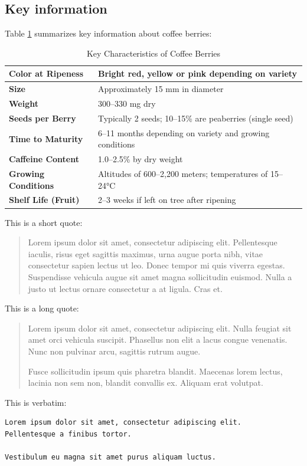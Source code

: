 \subsection{Key information}

Table \ref{ch2:tab:coffee_characteristics} summarizes key information about coffee berries:

\begin{table}
    \centering
    \caption{Key Characteristics of Coffee Berries}
    \medskip
    \label{ch2:tab:coffee_characteristics}
    \renewcommand{\arraystretch}{1.5}
    \begin{tabular}{|>{\bfseries}p{2in}|p{4in}|}
        \hline
        Color at Ripeness & Bright red, yellow or pink depending on variety \\
        \hline
        Size & Approximately 15 mm in diameter \\
        \hline
        Weight & 300--330 mg dry \\
        \hline
        Seeds per Berry & Typically 2 seeds; 10--15\% are peaberries (single seed) \\
        \hline
        Time to Maturity & 6--11 months depending on variety and growing conditions \\
        \hline
        Caffeine Content & 1.0--2.5\% by dry weight \\
        \hline
        Growing Conditions & Altitudes of 600--2,200 meters; temperatures of 15--24°C \\
        \hline
        Shelf Life (Fruit) & 2--3 weeks if left on tree after ripening \\
        \hline
    \end{tabular}
\end{table}

This is a short quote:
\begin{quote}
Lorem ipsum dolor sit amet, consectetur adipiscing elit. Pellentesque iaculis,
risus eget sagittis maximus, urna augue porta nibh, vitae consectetur sapien
lectus ut leo. Donec tempor mi quis viverra egestas. Suspendisse vehicula augue
sit amet magna sollicitudin euismod. Nulla a justo ut lectus ornare consectetur
a at ligula. Cras et.
\end{quote}

This is a long quote:
\begin{quotation}
Lorem ipsum dolor sit amet, consectetur adipiscing elit. Nulla feugiat sit
amet orci vehicula suscipit. Phasellus non elit a lacus congue venenatis.
Nunc non pulvinar arcu, sagittis rutrum augue.

Fusce sollicitudin ipsum quis pharetra blandit. Maecenas lorem lectus,
lacinia non sem non, blandit convallis ex. Aliquam erat volutpat.
\end{quotation}

This is verbatim:
\begin{verbatim}
Lorem ipsum dolor sit amet, consectetur adipiscing elit.
Pellentesque a finibus tortor.

Vestibulum eu magna sit amet purus aliquam luctus.
\end{verbatim}
